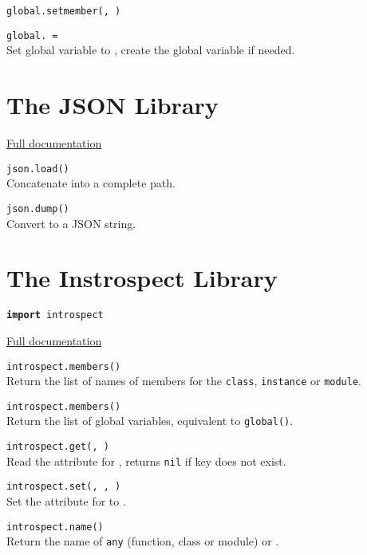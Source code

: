 \hangpar \texttt{global.setmember(}\texttt{, }\texttt{)}

\hangpar \texttt{global.}\texttt{ = } \\
Set global variable  to , create the global variable if needed.

\section*{The JSON Library}

\hangpar \href{https://github.com/berry-lang/berry/wiki/Chapter-7\#json-module}{Full documentation}

\hangpar \texttt{json.load(}\texttt{)} \\
Concatenate  into a complete path.

\hangpar \texttt{json.dump(}\texttt{)} \\
Convert  to a JSON string.

\section*{The Instrospect Library}

\hangpar \texttt{\textbf{import} introspect}

\hangpar \href{https://github.com/berry-lang/berry/wiki/Chapter-7\#module-introspect}{Full documentation}

\hangpar \texttt{introspect.members(}\texttt{)} \\
Return the list of names of members for the \texttt{class}, \texttt{instance} or \texttt{module}.

\hangpar \texttt{introspect.members()} \\
Return the list of global variables, equivalent to \texttt{global()}.

\hangpar \texttt{introspect.get(}\texttt{, }\texttt{)} \\
Read the attribute  for , returns \texttt{nil} if key does not exist.

\hangpar \texttt{introspect.set(}\texttt{, }\texttt{, }\texttt{)} \\
Set the attribute  for  to .

\hangpar \texttt{introspect.name(}\texttt{)} \\
Return the name of \texttt{any} (function, class or module) or .


